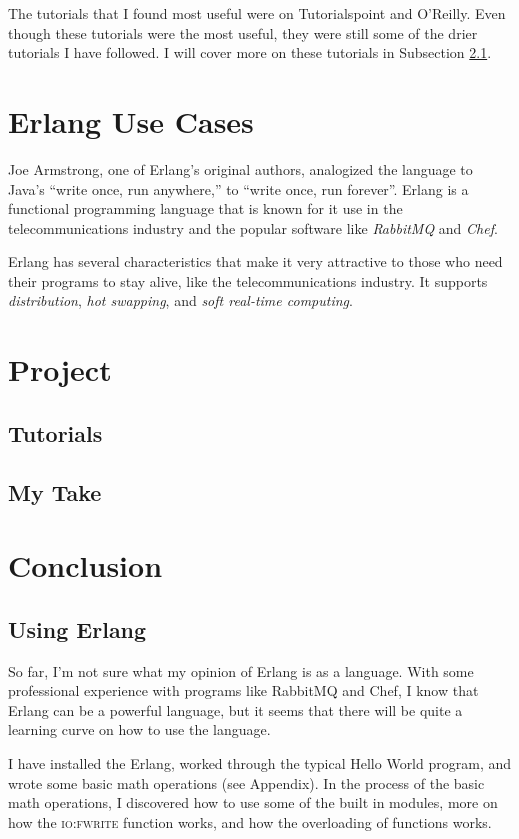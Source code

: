 \documentclass[11 pt]{IEEEtran}
\begin{document}
The tutorials that I found most useful were on Tutorialspoint\cite{tutorialspoint} and O'Reilly\cite{kessin}. Even though these tutorials were the most useful, they were still some of the drier tutorials I have followed. I will cover more on these tutorials in Subsection \ref{tutorials}.

\section{Erlang Use Cases}\label{usecase}
Joe Armstrong, one of Erlang's original authors, analogized the language to Java's ``write once, run anywhere,'' to ``write once, run forever''\cite{run-forever}. Erlang is a functional programming language that is known for it use in the telecommunications industry and the popular software like \emph{RabbitMQ}\cite{ribbitmq-wiki} and \emph{Chef}\cite{chef-wiki}. 

Erlang has several characteristics that make it very attractive to those who need their programs to stay alive, like the telecommunications industry. It supports \emph{distribution}, \emph{hot swapping}, and \emph{soft real-time computing}.

\section{Project}\label{project}
\subsection{Tutorials}\label{tutorials}
\subsection{My Take}\label{mytake}
 
\section{Conclusion}
\subsection{Using Erlang}
So far, I'm not sure what my opinion of Erlang is as a language. With some professional experience with programs like RabbitMQ and Chef, I know that Erlang can be a powerful language, but it seems that there will be quite a learning curve on how to use the language.

I have installed the Erlang, worked through the typical Hello World program, and wrote some basic math operations (see Appendix). In the process of the basic math operations, I discovered how to use some of the built in modules, more on how the \textsc{io:fwrite} function works, and how the overloading of functions works.
\end{document}
